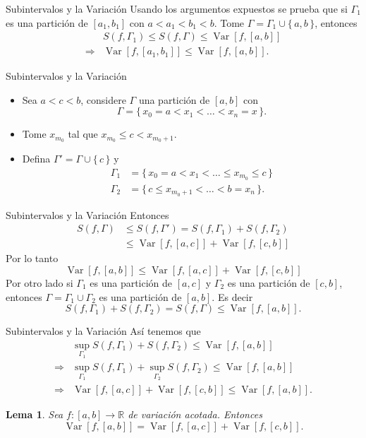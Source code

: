 \documentclass[utf8]{beamer}
\theoremstyle{plain}
\newtheorem{Lem}{Lema}                 %
\theoremstyle{definition}
\theoremstyle{remark}
\numberwithin{equation}{section}
\newcommand{\Ga}{\Gamma}                %
\newcommand{\bR}{\mathbb{R}}    %
\newcommand{\bonj}[1]{\left\lbrack#1\right\rbrack}
\newcommand{\set}[1]{\{\,#1\,\}}    %
\renewcommand{\leq}{\leqslant}          %
\newcommand{\To}{\Rightarrow}
\renewcommand{\.}{\Cdot}                %
\DeclareMathOperator{\Var}{Var}     %
\begin{document}
\begin{frame}{Subintervalos y la Variación}
  Usando los argumentos expuestos se prueba que si $\Ga_1$ es una partición de $[a_1,b_1]$ con $a<a_1<b_1<b$. %
  Tome $\Ga=\Ga_1\cup\set{a,b}$, entonces
\begin{align*}
  &S(f,\Ga_1)\leq S(f,\Ga)\leq\Var\bonj{f,[a,b]}\\
  \To&\Var\bonj{f,[a_1,b_1]}\leq \Var\bonj{f,[a,b]}.
\end{align*}

\end{frame}

\begin{frame}{Subintervalos y la Variación}
  \begin{itemize}
    \item Sea $a<c<b$, considere $\Ga$ una partición de $[a,b]$ con 
    $$\Ga=\set{x_0=a<x_1<\dots<x_n=x}.$$
    \item Tome $x_{m_0}$ tal que $x_{m_0}\leq c<x_{m_0+1}$.
    \item Defina $\Ga'=\Ga\cup\set{c}$ y
    \begin{align*}
      \Ga_1&=\set{x_0=a<x_1<\dots\leq x_{m_0}\leq c}\\
      \Ga_2&=\set{c\leq x_{m_0+1}<\dots<b=x_n}.
    \end{align*}
    
  \end{itemize}

\end{frame}

\begin{frame}{Subintervalos y la Variación}
  Entonces
    \begin{align*}
      S(f,\Ga)&\leq S(f,\Ga')=S(f,\Ga_1)+S(f,\Ga_2)\\
      &\leq\Var\bonj{f,[a,c]}+\Var\bonj{f,[c,b]} 
    \end{align*}
    Por lo tanto 
    $$\Var\bonj{f,[a,b]}\leq \Var\bonj{f,[a,c]}+\Var\bonj{f,[c,b]} $$
    Por otro lado si $\Ga_1$ es una partición de $[a,c]$ y $\Ga_2$ es una partición de $[c,b]$, entonces $\Ga=\Ga_1\cup\Ga_2$ es una partición de $[a,b]$. Es decir 
    $$S(f,\Ga_1)+S(f,\Ga_2)=S(f,\Ga)\leq\Var\bonj{f,[a,b]}.$$
\end{frame}

\begin{frame}{Subintervalos y la Variación}
  Así tenemos que 
\begin{align*}
  &\sup_{\Ga_1}S(f,\Ga_1)+S(f,\Ga_2)\leq\Var\bonj{f,[a,b]}\\
  \To&\sup_{\Ga_1}S(f,\Ga_1)+\sup_{\Ga_2}S(f,\Ga_2)\leq\Var\bonj{f,[a,b]}\\
  \To&\Var\bonj{f,[a,c]}+\Var\bonj{f,[c,b]}\leq\Var\bonj{f,[a,b]}.
\end{align*}
\begin{Lem}\label{lem:SubVar}
  Sea $f:[a,b]\to\bR$ de variación acotada. Entonces 
  $$\Var\bonj{f,[a,b]}=\Var\bonj{f,[a,c]}+\Var\bonj{f,[c,b]}.$$
\end{Lem}
\end{frame}
\end{document}
